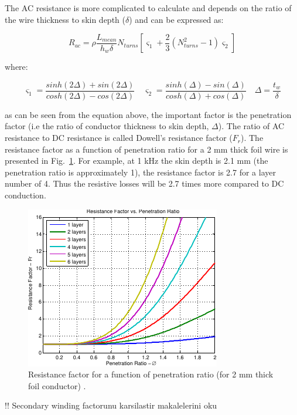 \documentclass[a4paper, 11pt]{article} %
\begin{document}
The AC resistance is more complicated to calculate and depends on the ratio of the wire thickness to skin depth ($\delta$) and can be expressed as:

\begin{equation}
  R_{ac}=\rho \frac{L_{mean}}{h_w \delta} N_{turns} \left[\varsigma_1 + \frac{2}{3} (N_{turns}^2-1)\varsigma_2\right]
\end{equation}

where:

\begin{equation}
  \varsigma_1 = \dfrac{sinh(2\Delta)+sin(2\Delta)}{cosh(2\Delta)-cos(2\Delta)} \quad
  \varsigma_2 = \dfrac{sinh(\Delta)-sin(\Delta)}{cosh(\Delta)+cos(\Delta)} \quad  
  \Delta = \dfrac{t_w}{\delta}
\end{equation}

as can be seen from the equation above,  the important factor is the penetration factor (i.e the ratio of conductor thickness to skin depth, $\Delta$). The ratio of AC resistance to DC resistance is called Dowell's resistance factor ($F_r$). The resistance factor as a function of penetration ratio for a 2 mm thick foil wire is presented in Fig.~\ref{resistance_factor}. For example, at 1 kHz the skin depth is 2.1 mm (the penetration ratio is approximately 1), the resistance factor is 2.7 for a layer number of 4. Thus the resistive losses will be 2.7 times more compared to DC conduction.

\begin{figure}[]
  \centering
    \includegraphics[scale=1.25]{resistance_factor}
  \caption{Resistance factor for a function of penetration ratio (for 2 mm thick foil conductor) \cite{Villar2010}.}
  \label{resistance_factor}
\end{figure}

!! Secondary winding factorunu karsilastir
\cite{Sullivan2003,Ferreira1994} makalelerini oku
\end{document}
